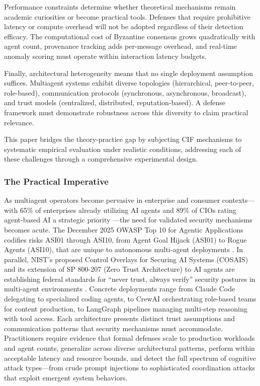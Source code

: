 \documentclass[
]{article}
\begin{document}
Performance constraints determine whether theoretical mechanisms remain
academic curiosities or become practical tools. Defenses that require
prohibitive latency or compute overhead will not be adopted regardless
of their detection efficacy. The computational cost of Byzantine
consensus grows quadratically with agent count, provenance tracking adds
per-message overhead, and real-time anomaly scoring must operate within
interaction latency budgets.

Finally, architectural heterogeneity means that no single deployment
assumption suffices. Multiagent systems exhibit diverse topologies
(hierarchical, peer-to-peer, role-based), communication protocols
(synchronous, asynchronous, broadcast), and trust models (centralized,
distributed, reputation-based). A defense framework must demonstrate
robustness across this diversity to claim practical relevance.

This paper bridges the theory-practice gap by subjecting CIF mechanisms
to systematic empirical evaluation under realistic conditions,
addressing each of these challenges through a comprehensive experimental
design.

\subsubsection{The Practical Imperative}\label{the-practical-imperative}

As multiagent operators become pervasive in enterprise and consumer
contexts---with 65\% of enterprises already utilizing AI agents and 89\%
of CIOs rating agent-based AI a strategic priority
\cite{crewai2026survey,gartner2025agentic}---the need for validated
security mechanisms becomes acute. The December 2025 OWASP Top 10 for
Agentic Applications codifies risks ASI01 through ASI10, from Agent Goal
Hijack (ASI01) to Rogue Agents (ASI10), that are unique to autonomous
multi-agent deployments \cite{owasp2025agentic}. In parallel, NIST's
proposed Control Overlays for Securing AI Systems (COSAIS) and its
extension of SP 800-207 (Zero Trust Architecture) to AI agents are
establishing federal standards for ``never trust, always verify''
security postures in multi-agent environments \cite{nist2025cosais}.
Concrete deployments range from Claude Code delegating to specialized
coding agents, to CrewAI orchestrating role-based teams for content
production, to LangGraph pipelines managing multi-step reasoning with
tool access. Each architecture presents distinct trust assumptions and
communication patterns that security mechanisms must accommodate.
Practitioners require evidence that formal defenses scale to production
workloads and agent counts, generalize across diverse architectural
patterns, perform within acceptable latency and resource bounds, and
detect the full spectrum of cognitive attack types---from crude prompt
injections to sophisticated coordination attacks that exploit emergent
system behaviors.
\end{document}
